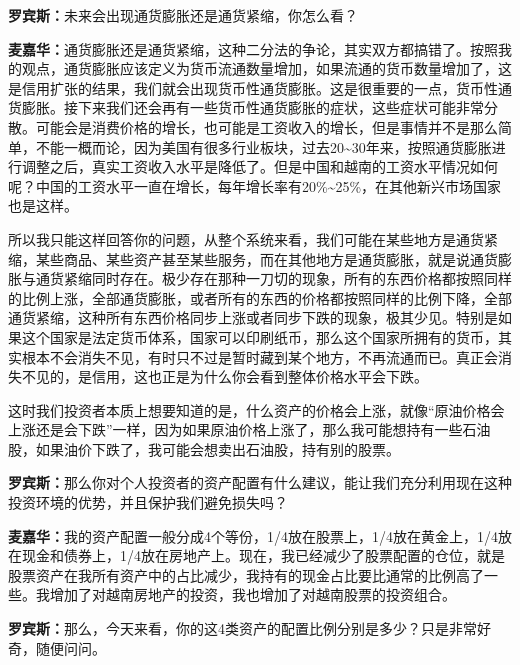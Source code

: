 \begin{BookQuote}
\textbf{罗宾斯：}未来会出现通货膨胀还是通货紧缩，你怎么看？
\end{BookQuote}

\begin{BookQuote}
\textbf{麦嘉华：}通货膨胀还是通货紧缩，这种二分法的争论，其实双方都搞错了。按照我的观点，通货膨胀应该定义为货币流通数量增加，如果流通的货币数量增加了，这是信用扩张的结果，我们就会出现货币性通货膨胀。这是很重要的一点，货币性通货膨胀。接下来我们还会再有一些货币性通货膨胀的症状，这些症状可能非常分散。可能会是消费价格的增长，也可能是工资收入的增长，但是事情并不是那么简单，不能一概而论，因为美国有很多行业板块，过去20\textasciitilde{}30年来，按照通货膨胀进行调整之后，真实工资收入水平是降低了。但是中国和越南的工资水平情况如何呢？中国的工资水平一直在增长，每年增长率有20\%\textasciitilde{}25\%，在其他新兴市场国家也是这样。
\end{BookQuote}

所以我只能这样回答你的问题，从整个系统来看，我们可能在某些地方是通货紧缩，某些商品、某些资产甚至某些服务，而在其他地方是通货膨胀，就是说通货膨胀与通货紧缩同时存在。极少存在那种一刀切的现象，所有的东西价格都按照同样的比例上涨，全部通货膨胀，或者所有的东西的价格都按照同样的比例下降，全部通货紧缩，这种所有东西价格同步上涨或者同步下跌的现象，极其少见。特别是如果这个国家是法定货币体系，国家可以印刷纸币，那么这个国家所拥有的货币，其实根本不会消失不见，有时只不过是暂时藏到某个地方，不再流通而已。真正会消失不见的，是信用，这也正是为什么你会看到整体价格水平会下跌。

这时我们投资者本质上想要知道的是，什么资产的价格会上涨，就像“原油价格会上涨还是会下跌”一样，因为如果原油价格上涨了，那么我可能想持有一些石油股，如果油价下跌了，我可能会想卖出石油股，持有别的股票。

\begin{BookQuote}
\textbf{罗宾斯：}那么你对个人投资者的资产配置有什么建议，能让我们充分利用现在这种投资环境的优势，并且保护我们避免损失吗？
\end{BookQuote}

\begin{BookQuote}
\textbf{麦嘉华：}我的资产配置一般分成4个等份，1/4放在股票上，1/4放在黄金上，1/4放在现金和债券上，1/4放在房地产上。现在，我已经减少了股票配置的仓位，就是股票资产在我所有资产中的占比减少，我持有的现金占比要比通常的比例高了一些。我增加了对越南房地产的投资，我也增加了对越南股票的投资组合。
\end{BookQuote}

\begin{BookQuote}
\textbf{罗宾斯：}那么，今天来看，你的这4类资产的配置比例分别是多少？只是非常好奇，随便问问。
\end{BookQuote}

